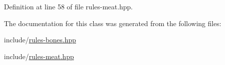 Definition at line 58 of file rules-\/meat.\+hpp.



The documentation for this class was generated from the following files\+:\begin{DoxyCompactItemize}
\item 
include/\hyperlink{rules-bones_8hpp}{rules-\/bones.\+hpp}\item 
include/\hyperlink{rules-meat_8hpp}{rules-\/meat.\+hpp}\end{DoxyCompactItemize}
